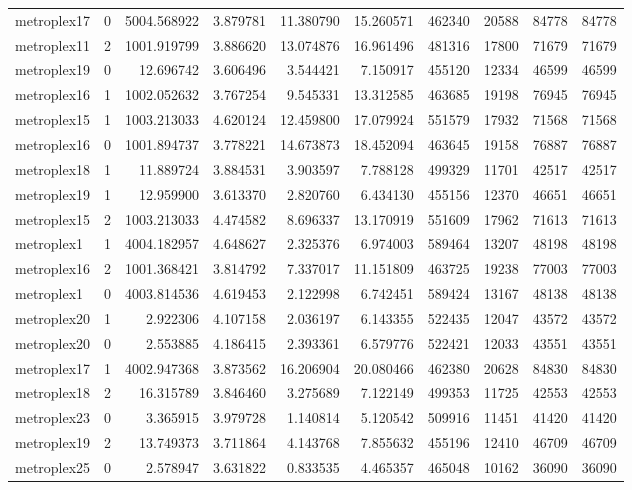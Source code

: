 \begin{longtable}{|l|r|r|r|r|r|r|r|r|r|}
metroplex17 & 0 & 5004.568922 & 3.879781 & 11.380790 & 15.260571 & 462340 & 20588 & 84778 & 84778 \\
metroplex11 & 2 & 1001.919799 & 3.886620 & 13.074876 & 16.961496 & 481316 & 17800 & 71679 & 71679 \\
metroplex19 & 0 & 12.696742 & 3.606496 & 3.544421 & 7.150917 & 455120 & 12334 & 46599 & 46599 \\
metroplex16 & 1 & 1002.052632 & 3.767254 & 9.545331 & 13.312585 & 463685 & 19198 & 76945 & 76945 \\
metroplex15 & 1 & 1003.213033 & 4.620124 & 12.459800 & 17.079924 & 551579 & 17932 & 71568 & 71568 \\
metroplex16 & 0 & 1001.894737 & 3.778221 & 14.673873 & 18.452094 & 463645 & 19158 & 76887 & 76887 \\
metroplex18 & 1 & 11.889724 & 3.884531 & 3.903597 & 7.788128 & 499329 & 11701 & 42517 & 42517 \\
metroplex19 & 1 & 12.959900 & 3.613370 & 2.820760 & 6.434130 & 455156 & 12370 & 46651 & 46651 \\
metroplex15 & 2 & 1003.213033 & 4.474582 & 8.696337 & 13.170919 & 551609 & 17962 & 71613 & 71613 \\
metroplex1 & 1 & 4004.182957 & 4.648627 & 2.325376 & 6.974003 & 589464 & 13207 & 48198 & 48198 \\
metroplex16 & 2 & 1001.368421 & 3.814792 & 7.337017 & 11.151809 & 463725 & 19238 & 77003 & 77003 \\
metroplex1 & 0 & 4003.814536 & 4.619453 & 2.122998 & 6.742451 & 589424 & 13167 & 48138 & 48138 \\
metroplex20 & 1 & 2.922306 & 4.107158 & 2.036197 & 6.143355 & 522435 & 12047 & 43572 & 43572 \\
metroplex20 & 0 & 2.553885 & 4.186415 & 2.393361 & 6.579776 & 522421 & 12033 & 43551 & 43551 \\
metroplex17 & 1 & 4002.947368 & 3.873562 & 16.206904 & 20.080466 & 462380 & 20628 & 84830 & 84830 \\
metroplex18 & 2 & 16.315789 & 3.846460 & 3.275689 & 7.122149 & 499353 & 11725 & 42553 & 42553 \\
metroplex23 & 0 & 3.365915 & 3.979728 & 1.140814 & 5.120542 & 509916 & 11451 & 41420 & 41420 \\
metroplex19 & 2 & 13.749373 & 3.711864 & 4.143768 & 7.855632 & 455196 & 12410 & 46709 & 46709 \\
metroplex25 & 0 & 2.578947 & 3.631822 & 0.833535 & 4.465357 & 465048 & 10162 & 36090 & 36090 \\

\end{longtable}
